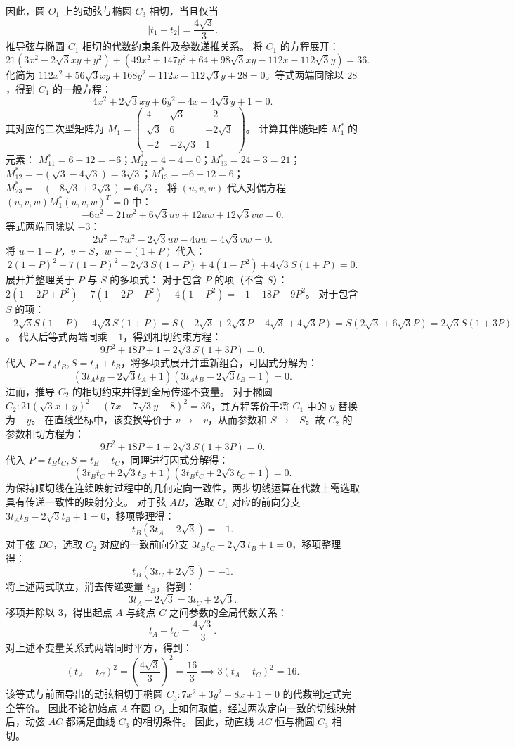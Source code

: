 \begin{solution}
因此，圆 $O_1$ 上的动弦与椭圆 $C_3$ 相切，当且仅当
\[
|t_1 - t_2| = \frac{4\sqrt{3}}{3}.
\]
推导弦与椭圆 $C_1$ 相切的代数约束条件及参数递推关系。
将 $C_1$ 的方程展开：
\[ 21(3x^2 - 2\sqrt{3}xy + y^2) + (49x^2 + 147y^2 + 64 + 98\sqrt{3}xy - 112x - 112\sqrt{3}y) = 36. \]
化简为 $112x^2 + 56\sqrt{3}xy + 168y^2 - 112x - 112\sqrt{3}y + 28 = 0$。等式两端同除以 $28$，得到 $C_1$ 的一般方程：
\[ 4x^2 + 2\sqrt{3}xy + 6y^2 - 4x - 4\sqrt{3}y + 1 = 0. \]
其对应的二次型矩阵为 $M_1 = \begin{pmatrix} 4 & \sqrt{3} & -2 \\ \sqrt{3} & 6 & -2\sqrt{3} \\ -2 & -2\sqrt{3} & 1 \end{pmatrix}$。
计算其伴随矩阵 $M_1^*$ 的元素：
$M_{11}^* = 6 - 12 = -6$；$M_{22}^* = 4 - 4 = 0$；$M_{33}^* = 24 - 3 = 21$；
$M_{12}^* = -( \sqrt{3} - 4\sqrt{3} ) = 3\sqrt{3}$；$M_{13}^* = -6 + 12 = 6$；$M_{23}^* = -(-8\sqrt{3} + 2\sqrt{3}) = 6\sqrt{3}$。
将 $(u, v, w)$ 代入对偶方程 $(u, v, w) M_1^* (u, v, w)^T = 0$ 中：
\[ -6u^2 + 21w^2 + 6\sqrt{3}uv + 12uw + 12\sqrt{3}vw = 0. \]
等式两端同除以 $-3$：
\[ 2u^2 - 7w^2 - 2\sqrt{3}uv - 4uw - 4\sqrt{3}vw = 0. \]
将 $u = 1-P$，$v = S$，$w = -(1+P)$ 代入：
\[ 2(1-P)^2 - 7(1+P)^2 - 2\sqrt{3}S(1-P) + 4(1-P^2) + 4\sqrt{3}S(1+P) = 0. \]
展开并整理关于 $P$ 与 $S$ 的多项式：
对于包含 $P$ 的项（不含 $S$）：$2(1 - 2P + P^2) - 7(1 + 2P + P^2) + 4(1 - P^2) = -1 - 18P - 9P^2$。
对于包含 $S$ 的项：$-2\sqrt{3}S(1-P) + 4\sqrt{3}S(1+P) = S(-2\sqrt{3} + 2\sqrt{3}P + 4\sqrt{3} + 4\sqrt{3}P) = S(2\sqrt{3} + 6\sqrt{3}P) = 2\sqrt{3}S(1+3P)$。
代入后等式两端同乘 $-1$，得到相切约束方程：
\[ 9P^2 + 18P + 1 - 2\sqrt{3}S(1+3P) = 0. \]
代入 $P = t_A t_B, S = t_A + t_B$，将多项式展开并重新组合，可因式分解为：
\[ (3t_A t_B - 2\sqrt{3}t_A + 1)(3t_A t_B - 2\sqrt{3}t_B + 1) = 0. \]
进而，推导 $C_2$ 的相切约束并得到全局传递不变量。
对于椭圆 $C_2: 21(\sqrt{3}x + y)^2 + (7x - 7\sqrt{3}y - 8)^2 = 36$，其方程等价于将 $C_1$ 中的 $y$ 替换为 $-y$。
在直线坐标中，该变换等价于 $v \to -v$，从而参数和 $S \to -S$。故 $C_2$ 的参数相切方程为：
\[ 9P^2 + 18P + 1 + 2\sqrt{3}S(1+3P) = 0. \]
代入 $P = t_B t_C, S = t_B + t_C$，同理进行因式分解得：
\[ (3t_B t_C + 2\sqrt{3}t_B + 1)(3t_B t_C + 2\sqrt{3}t_C + 1) = 0. \]
为保持顺切线在连续映射过程中的几何定向一致性，两步切线运算在代数上需选取具有传递一致性的映射分支。
对于弦 $AB$，选取 $C_1$ 对应的前向分支 $3t_A t_B - 2\sqrt{3}t_B + 1 = 0$，移项整理得：
\[ t_B(3t_A - 2\sqrt{3}) = -1. \]
对于弦 $BC$，选取 $C_2$ 对应的一致前向分支 $3t_B t_C + 2\sqrt{3}t_B + 1 = 0$，移项整理得：
\[ t_B(3t_C + 2\sqrt{3}) = -1. \]
将上述两式联立，消去传递变量 $t_B$，得到：
\[ 3t_A - 2\sqrt{3} = 3t_C + 2\sqrt{3}. \]
移项并除以 $3$，得出起点 $A$ 与终点 $C$ 之间参数的全局代数关系：
\[ t_A - t_C = \frac{4\sqrt{3}}{3}. \]
对上述不变量关系式两端同时平方，得到：
\[ (t_A - t_C)^2 = \left(\frac{4\sqrt{3}}{3}\right)^2 = \frac{16}{3} \implies 3(t_A - t_C)^2 = 16. \]
该等式与前面导出的动弦相切于椭圆 $C_3: 7x^2 + 3y^2 + 8x + 1 = 0$ 的代数判定式完全等价。
因此不论初始点 $A$ 在圆 $O_1$ 上如何取值，经过两次定向一致的切线映射后，动弦 $AC$ 都满足曲线 $C_3$ 的相切条件。
因此，动直线 $AC$ 恒与椭圆 $C_3$ 相切。
\end{solution}





